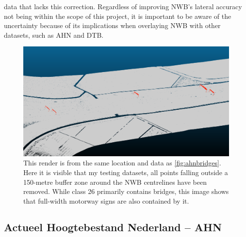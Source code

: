 data that lacks this correction. Regardless of improving NWB’s lateral accuracy not being within the scope of this project, it is important to be aware of the uncertainty because of its implications when overlaying NWB with other datasets, such as AHN and DTB.

\begin{figure}[ht]
    \centering
    \includegraphics[width=\linewidth]{p2/figs/ahn_sample_02.png} 
    \caption{This render is from the same location and data as \ref{fig:ahnbridges}. Here it is visible that my testing datasets, all points falling outside a 150-metre buffer zone around the NWB centrelines have been removed. While class 26 primarily contains bridges, this image shows that full-width motorway signs are also contained by it.}
    \label{fig:ahnsigns}
\end{figure}

\subsection{Actueel Hoogtebestand Nederland – AHN}
\label{sub:ahn}

